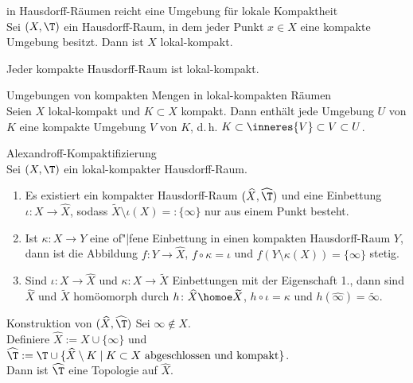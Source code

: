 \begin{Satz}{in Hausdorff-Räumen reicht eine Umgebung für lokale Kompaktheit}\\
    Sei $(X, \T)$ ein Hausdorff-Raum, in dem jeder Punkt $x \in X$ eine
    kompakte Umgebung besitzt.
    Dann ist $X$ lokal-kompakt.
\end{Satz}

\begin{Kor}
    Jeder kompakte Hausdorff-Raum ist lokal-kompakt.
\end{Kor}

\begin{Satz}{Umgebungen von kompakten Mengen in lokal-kompakten Räumen}\\
    Seien $X$ lokal-kompakt und $K \subset X$ kompakt.
    Dann enthält jede Umgebung $U$ von $K$ eine kompakte Umgebung $V$ von $K$,
    d.\,h. $K \subset \inneres{V} \subset V \subset U$.
\end{Satz}

\linie

\begin{Satz}{Alexandroff-Kompaktifizierung}\\
    Sei $(X, \T)$ ein lokal-kompakter Hausdorff-Raum.
    \begin{enumerate}
        \item
        Es existiert ein kompakter Hausdorff-Raum $(\widehat{X}, \widehat{\T})$
        und eine Einbettung $\iota\colon X \rightarrow \widehat{X}$, sodass
        $\widetilde{X} \setminus \iota(X) =: \{\infty\}$ nur aus einem
        Punkt besteht.

        \item
        Ist $\kappa\colon X \rightarrow Y$ eine of"|fene Einbettung in einen
        kompakten Hausdorff-Raum $Y$, dann ist die Abbildung
        $f\colon Y \rightarrow \widehat{X}$, $f \circ \kappa = \iota$ und
        $f(Y \setminus \kappa(X)) = \{\infty\}$ stetig.

        \item
        Sind $\iota\colon X \rightarrow \widehat{X}$ und
        $\kappa\colon X \rightarrow \widetilde{X}$ Einbettungen mit der
        Eigenschaft 1., dann sind $\widehat{X}$ und $\widetilde{X}$ homöomorph
        durch $h\colon \widehat{X} \homoe \widetilde{X}$,
        $h \circ \iota = \kappa$ und
        $h(\widehat{\infty}) = \widetilde{\infty}$.
    \end{enumerate}
\end{Satz}

\begin{Lemma}{Konstruktion von $(\widehat{X}, \widehat{\T})$}
    Sei $\infty \notin X$. \\
    Definiere $\widehat{X} := X \cup \{\infty\}$ und
    $\widehat{\T} := \T \cup \{\widehat{X} \setminus K \;|\;
    K \subset X \text{ abgeschlossen und kompakt}\}$. \\
    Dann ist $\widehat{\T}$ eine Topologie auf $\widehat{X}$.
\end{Lemma}

